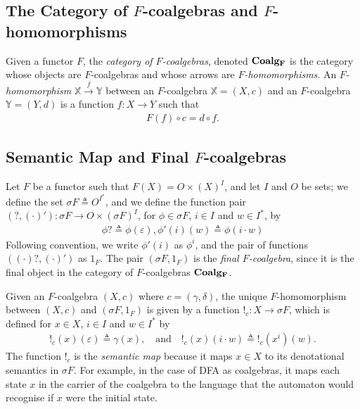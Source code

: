 \subsection{\texorpdfstring{The Category of $F$-coalgebras and $F$-homomorphisms}{The Category of F-coalgebras and F-homomorphisms}}
Given a functor $F$, the \emph{category of $F$-coalgebras}, denoted $\AsCategory{Coalg_F}$ is the category whose objects are $F$-coalgebras and whose arrows are \emph{$F$-homomorphisms}. An \emph{$F$-homomorphism} $\mathbb{X}\xrightarrow{f} \mathbb{Y}$ between an $F$-coalgebra $\mathbb{X}=(X,c)$ and an $F$-coalgebra $\mathbb{Y}=(Y,d)$ is a function $f\colon X\rightarrow Y$ such that
\begin{align}
    F(f)\circ c = d\circ f.
\end{align}

\subsection{Semantic Map and Final \texorpdfstring{$F$-coalgebras}{F-coalgebras}}
Let $F$ be a functor such that $F(X)=O\times (X)^I$, and let $I$ and $O$ be sets; we define the set $\sigma F\triangleq O^{I^*}$, and we define the function pair $(?, (\cdot)')\colon \sigma F\rightarrow O\times (\sigma F)^I$, for $\phi \in \sigma F$, $i\in I$ and $w\in I^*$, by
\begin{align}
    \phi? \triangleq \phi(\varepsilon),
    \phi'(i)(w) \triangleq \phi(i\cdot w)
\end{align}
Following convention, we write $\phi'(i)$ as $\phi^i$, and the pair of functions $((\cdot) ?, (\cdot)')$ as $1_F$. The pair $(\sigma F, 1_F)$ is the \emph{final $F$-coalgebra}, since it is the final object in the category of $F$-coalgebras $\AsCategory{Coalg_F}$.

Given an $F$-coalgebra $(X,c)$ where $c=(\gamma,\delta)$, the unique $F$-homomorphism between $(X,c)$ and $(\sigma F, 1_F)$ is given by a function $!_c\colon X\rightarrow \sigma F$, which is defined for $x\in X$, $i\in I$ and $w\in I^*$ by 
\begin{align}
    !_c(x)(\varepsilon)\triangleq \gamma(x),\quad \text{and} \quad 
    !_c(x)(i\cdot w)\triangleq !_c(x^i)(w).
\end{align}
The function $!_c$ is the \emph{semantic map} because it maps $x\in X$ to its denotational semantics in $\sigma F$. For example, in the case of DFA as coalgebras, it maps each state $x$ in the carrier of the coalgebra to the language that the automaton would recognise if $x$ were the initial state.

